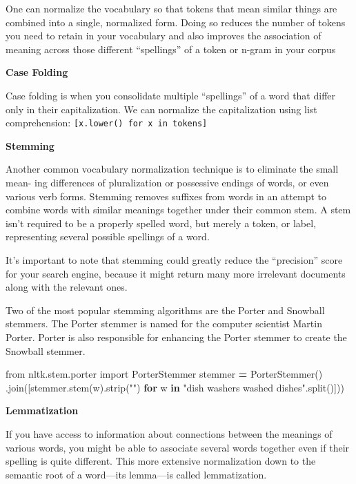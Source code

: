 \documentclass[
]{book}
\newenvironment{Shaded}{\begin{snugshade}}{\end{snugshade}}
\newcommand{\CommentTok}[1]{\textcolor[rgb]{0.56,0.35,0.01}{\textit{#1}}}
\newcommand{\ControlFlowTok}[1]{\textcolor[rgb]{0.13,0.29,0.53}{\textbf{#1}}}
\newcommand{\ImportTok}[1]{#1}
\newcommand{\KeywordTok}[1]{\textcolor[rgb]{0.13,0.29,0.53}{\textbf{#1}}}
\newcommand{\NormalTok}[1]{#1}
\newcommand{\OperatorTok}[1]{\textcolor[rgb]{0.81,0.36,0.00}{\textbf{#1}}}
\newcommand{\StringTok}[1]{\textcolor[rgb]{0.31,0.60,0.02}{#1}}
\begin{document}
One can normalize the vocabulary so that tokens that mean similar things are combined into a single, normalized form. Doing so reduces the number of tokens you need to retain in your vocabulary and also improves the association of meaning across those different ``spellings'' of a token or n-gram in your corpus

\textbf{Case Folding}

Case folding is when you consolidate multiple ``spellings'' of a word that differ only in their capitalization. We can normalize the capitalization using list comprehension: \texttt{{[}x.lower()\ for\ x\ in\ tokens{]}}

\textbf{Stemming}

Another common vocabulary normalization technique is to eliminate the small mean- ing differences of pluralization or possessive endings of words, or even various verb forms. Stemming removes suffixes from words in an attempt to combine words with similar meanings together under their common stem. A stem isn't required to be a properly spelled word, but merely a token, or label, representing several possible spellings of a word.

It's important to note that stemming could greatly reduce the ``precision'' score for your search engine,
because it might return many more irrelevant documents along with the relevant ones.

Two of the most popular stemming algorithms are the Porter and Snowball stemmers. The Porter stemmer is named for the computer scientist Martin Porter. Porter is also responsible for enhancing the Porter stemmer to create the Snowball stemmer.

\begin{Shaded}
\begin{Highlighting}[]
\ImportTok{from}\NormalTok{ nltk.stem.porter}
\ImportTok{import}\NormalTok{ PorterStemmer}
\NormalTok{stemmer }\OperatorTok{=}\NormalTok{ PorterStemmer()}
\CommentTok{\textquotesingle{} \textquotesingle{}}\NormalTok{.join([stemmer.stem(w).strip(}\StringTok{"\textquotesingle{}"}\NormalTok{) }\ControlFlowTok{for}\NormalTok{ w }\KeywordTok{in} \StringTok{"dish washer\textquotesingle{}s washed dishes"}\NormalTok{.split()]))}
\end{Highlighting}
\end{Shaded}

\textbf{Lemmatization}

If you have access to information about connections between the meanings of various words, you might be able to associate several words together even if their spelling is quite different. This more extensive normalization down to the semantic root of a word---its lemma---is called lemmatization.
\end{document}
